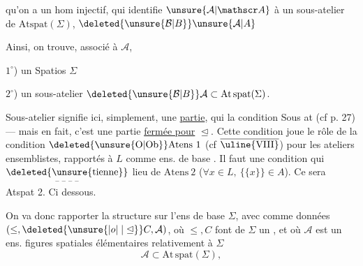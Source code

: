 qu'on a un hom injectif, qui identifie $\unsure{\mathcal A|\mathscr A}$ à un sous-atelier de $\mathrm{Atspat}(\Sigma)$,   $\deleted{\unsure{\mathcal B|B}}\unsure{\mathcal A|A}$

Ainsi, on trouve, associé à $\mathcal A$, 

$1^{\circ}$) un Spatios $\Sigma$

$2^{\circ}$) un sous-atelier $\deleted{\unsure{\mathcal B|B}}\mathcal A\subset\mathrm{At}\,\mathrm{spat}(\Sigma)$. 

Sous-atelier signifie ici, simplement, une \uline{partie}, qui  la condition Sous at (cf p. 27) --- mais en fait, c'est  une partie \uline{fermée pour} $\trianglelefteq$.
Cette condition joue le rôle de la condition $\deleted{\unsure{\mathrm O|\mathrm{Ob}}}\mathrm{Atens}\ 1$ (cf  $\overline{\text{\uline{VIII}}}$) pour les ateliers ensemblistes, rapportés à $L$ comme ens. de base . Il faut une condition qui $\underset{\text{-- -- -- --}}{\text{\deleted{\unsure{tienne}}}}$ lieu de $\mathrm{Atens}\ 2$ ($\forall x\in L,\ \{\{x\}\}\in A$). Ce sera Atspat 2. Ci dessous.

 On va donc rapporter la structure sur l'ens de base $\Sigma$, avec comme données $(\leq,\deleted{\unsure{\mathrel{|o|}|\trianglelefteq}}C,\mathcal A)$, où $\leq,C$ font de $\Sigma$ un , et où $\mathcal A$ est un  ens.  figures spatiales élémentaires  relativement à $\Sigma$
\[
\mathcal A\subset\mathrm{At}\,\mathrm{spat}(\Sigma),
\]
